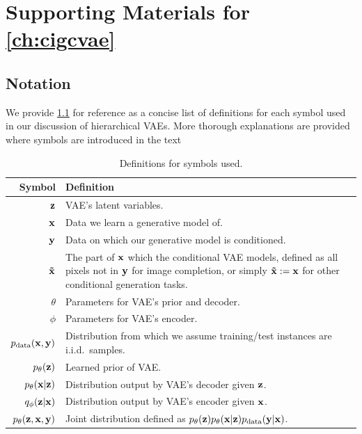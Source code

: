 \chapter{Supporting Materials for \cref{ch:cigcvae}}

\section{Notation}
We provide \cref{tab:cigcvae-notation} for reference as a concise list of definitions
for each symbol used in our discussion of hierarchical VAEs. More thorough explanations are provided where symbols are
introduced in the text

\begin{table}
  \caption{Definitions for symbols used.}
  \label{tab:cigcvae-notation}
  \centering
  \begin{tabular}{rp{11cm}}
    \toprule
    Symbol    & Definition   \\
    \midrule
    ${\mathbf{z}}$                                   & VAE's latent variables. \\
    ${\mathbf{x}}$                                & Data we learn a generative model of. \\
    ${\mathbf{y}}$                            & Data on which our generative model is conditioned. \\
    $\mathbf{\tilde{x}}{}$                           & The part of ${\mathbf{x}}$ which the conditional VAE models, defined as all pixels not in ${\mathbf{y}}$ for image completion, or simply $\mathbf{\tilde{x}} := {\mathbf{x}}$ for other conditional generation tasks. \\
    $\theta$                              & Parameters for VAE's prior and decoder. \\
    $\phi$                                & Parameters for VAE's encoder. \\
    $p_{\rm{data}} ({\mathbf{x}}, {\mathbf{y}})$            & Distribution from which we assume training/test instances are i.i.d.~samples. \\
    $p_\theta({\mathbf{z}})$                        & Learned prior of VAE. \\
    $p_\theta({\mathbf{x}}|{\mathbf{z}})$                   & Distribution output by VAE's decoder given ${\mathbf{z}}$. \\
    $q_\phi({\mathbf{z}}|{\mathbf{x}})$                           & Distribution output by VAE's encoder given ${\mathbf{x}}$. \\
    $p_\theta({\mathbf{z}}, {\mathbf{x}}, {\mathbf{y}})$        & Joint distribution defined as $p_\theta({\mathbf{z}})p_\theta({\mathbf{x}}|{\mathbf{z}})p_{\rm{data}} ({\mathbf{y}}|{\mathbf{x}})$. \\

\end{tabular}
\end{table}
